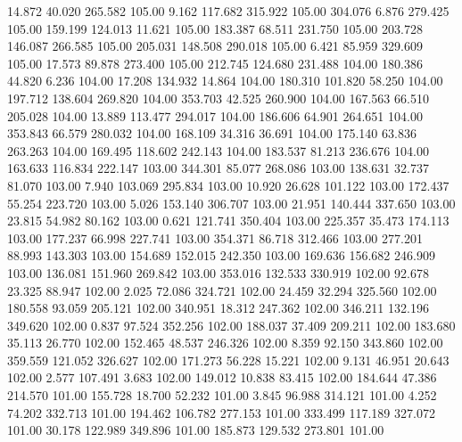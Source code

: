   14.872   40.020  265.582       105.00
   9.162  117.682  315.922       105.00
 304.076    6.876  279.425       105.00
 159.199  124.013   11.621       105.00
 183.387   68.511  231.750       105.00
 203.728  146.087  266.585       105.00
 205.031  148.508  290.018       105.00
   6.421   85.959  329.609       105.00
  17.573   89.878  273.400       105.00
 212.745  124.680  231.488       104.00
 180.386   44.820    6.236       104.00
  17.208  134.932   14.864       104.00
 180.310  101.820   58.250       104.00
 197.712  138.604  269.820       104.00
 353.703   42.525  260.900       104.00
 167.563   66.510  205.028       104.00
  13.889  113.477  294.017       104.00
 186.606   64.901  264.651       104.00
 353.843   66.579  280.032       104.00
 168.109   34.316   36.691       104.00
 175.140   63.836  263.263       104.00
 169.495  118.602  242.143       104.00
 183.537   81.213  236.676       104.00
 163.633  116.834  222.147       103.00
 344.301   85.077  268.086       103.00
 138.631   32.737   81.070       103.00
   7.940  103.069  295.834       103.00
  10.920   26.628  101.122       103.00
 172.437   55.254  223.720       103.00
   5.026  153.140  306.707       103.00
  21.951  140.444  337.650       103.00
  23.815   54.982   80.162       103.00
   0.621  121.741  350.404       103.00
 225.357   35.473  174.113       103.00
 177.237   66.998  227.741       103.00
 354.371   86.718  312.466       103.00
 277.201   88.993  143.303       103.00
 154.689  152.015  242.350       103.00
 169.636  156.682  246.909       103.00
 136.081  151.960  269.842       103.00
 353.016  132.533  330.919       102.00
  92.678   23.325   88.947       102.00
   2.025   72.086  324.721       102.00
  24.459   32.294  325.560       102.00
 180.558   93.059  205.121       102.00
 340.951   18.312  247.362       102.00
 346.211  132.196  349.620       102.00
   0.837   97.524  352.256       102.00
 188.037   37.409  209.211       102.00
 183.680   35.113   26.770       102.00
 152.465   48.537  246.326       102.00
   8.359   92.150  343.860       102.00
 359.559  121.052  326.627       102.00
 171.273   56.228   15.221       102.00
   9.131   46.951   20.643       102.00
   2.577  107.491    3.683       102.00
 149.012   10.838   83.415       102.00
 184.644   47.386  214.570       101.00
 155.728   18.700   52.232       101.00
   3.845   96.988  314.121       101.00
   4.252   74.202  332.713       101.00
 194.462  106.782  277.153       101.00
 333.499  117.189  327.072       101.00
  30.178  122.989  349.896       101.00
 185.873  129.532  273.801       101.00
